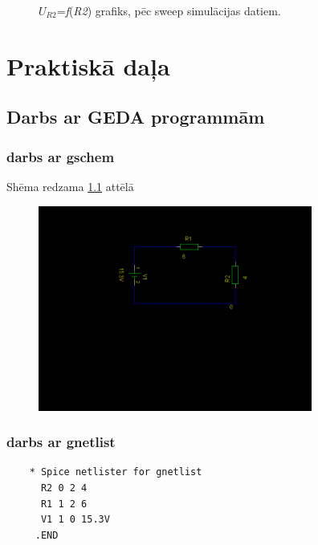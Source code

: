 \documentclass{report}
\begin{document}
\begin{figure}
\begin{center}
\caption{$U_{R2}$=\textit{f}(\textit{R2}) grafiks, pēc sweep simulācijas datiem.}\label{graph:1}
\end{center}
\end{figure}


\chapter {Praktiskā daļa}
\section {Darbs ar GEDA programmām}
\subsection{darbs ar gschem \cite{gschem}}
Shēma redzama \ref{att:1} attēlā

\begin{figure}[b!]
\centering
\includegraphics[width=9cm]{01.png}
\label{att:1}
\end{figure}

\newpage
\subsection{darbs ar gnetlist}
\begin{verbatim}
    * Spice netlister for gnetlist
      R2 0 2 4
      R1 1 2 6
      V1 1 0 15.3V
     .END
\end{verbatim}
\end{document}
